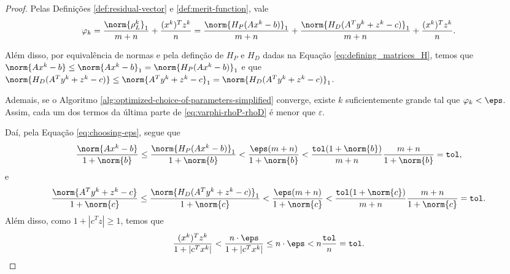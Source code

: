 \begin{proof}
	 Pelas Definições \ref{def:residual-vector} e \ref{def:merit-function}, vale
	\begin{equation}
		\label{eq:varphi-rhoP-rhoD}
				\varphi_{k} =  \frac{\norm{\rho^{k}_L}_1}{m+n} + 
\frac{(x^{k})^Tz^{k}}{n}  = \frac{\norm{H_{P}(Ax^{k} - b)}_1}{m+n} +\frac{\norm{H_{D}(A^{T}y^{k} + z^{k}- c)}_1 }{m+n} + 
\frac{(x^{k})^Tz^{k}}{n}.
	\end{equation}

Além disso, por equivalência de normas e pela definção de $H_{P}$ e $H_{D}$ dadas na Equação \eqref{eq:defining_matrices_H}, temos que $\norm{Ax^{k} - b} \leq \norm{Ax^{k} - b}_{1} = \norm{H_{P}(Ax^{k} - b)}_{1}$ e que $\norm{H_{D}(A^{T}y^{k} + z^{k}- c)} \leq \norm{A^{T}y^{k} + z^{k}- c}_1 = \norm{H_{D}(A^{T}y^{k} + z^{k}- c)}_1$.

Ademais, se  o Algoritmo \ref{alg:optimized-choice-of-parameters-simplified} converge, existe $k$ suficientemente grande tal que $\varphi_{k}<\eps$. Assim, cada um dos termos da última parte de \eqref{eq:varphi-rhoP-rhoD} é menor que $\varepsilon$.


Daí, pela Equação \eqref{eq:choosing-eps}, segue que 
\[
\dfrac{\norm{Ax^{k} - b}}{1 + \norm{b}} \leq  \frac{\norm{H_{P}(Ax^{k} - b)}_1  }{1 + \norm{b}} < \frac{\eps (m+n)}{1 + \norm{b}} <\frac{\tol(1+\norm{b})}{m+n} \frac{m+n}{1 + \norm{b}} = \tol,
\]
e
\[
\dfrac{\norm{A^{T}y^{k} + z^{k}- c}}{1 + \norm{c}} \leq  \frac{\norm{H_{D}(A^{T}y^{k} + z^{k}- c)}_{1}  }{1 + \norm{c}} < \frac{\eps (m+n)}{1 + \norm{c}} <\frac{\tol(1+\norm{c})}{m+n} \frac{m+n}{1 + \norm{c}} = \tol.
\]
Além disso, como $1+ |c^{T}z| \geq 1$, temos que 
\[
\dfrac{(x^{k})^{T}z^{k}}{1+ |c^{T}x^{k}|} <   \frac{n\cdot  \eps}{1+ |c^{T}x^{k}|} \leq n \cdot \eps < n \frac{\tol}{n} = \tol. \qedhere
\]
 \end{proof}

